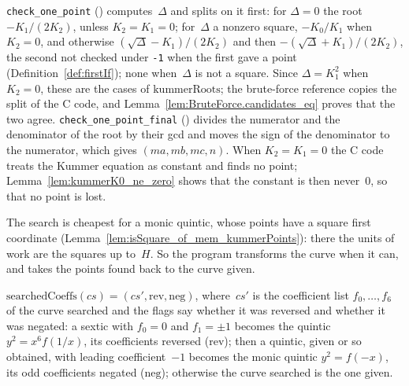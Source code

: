 \begin{remark}\label{rem:specRootsC}
  \texttt{check\_one\_point} () computes~$\Delta$ and splits on it
  first: for $\Delta = 0$ the root $-K_1/(2 K_2)$, unless $K_2 = K_1 = 0$; for~$\Delta$ a nonzero
  square, $-K_0/K_1$ when $K_2 = 0$, and otherwise $(\sqrt{\Delta} - K_1)/(2 K_2)$ and then
  $-(\sqrt{\Delta} + K_1)/(2 K_2)$, the second not checked under \texttt{-1} when the first gave a
  point (Definition~\ref{def:firstIf}); none when~$\Delta$ is not a square. Since $\Delta = K_1^2$
  when $K_2 = 0$, these are the cases of $\mathrm{kummerRoots}$; the brute-force reference copies
  the split of the C code, and Lemma~\ref{lem:BruteForce.candidates_eq} proves that the two agree.
  \texttt{check\_one\_point\_final} () divides the numerator and
  the denominator of the root by their gcd and moves the sign of the denominator to the numerator,
  which gives $(m a, m b, m c, n)$. When $K_2 = K_1 = 0$ the C code treats the Kummer equation as
  constant and finds no point; Lemma~\ref{lem:kummerK0_ne_zero} shows that the constant is then
  never~$0$, so that no point is lost.
\end{remark}

The search is cheapest for a monic quintic, whose points have a square first coordinate
(Lemma~\ref{lem:isSquare_of_mem_kummerPoints}): there the units of work are the squares up to~$H$.
So the program transforms the curve when it can, and takes the points found back to the curve
given.

\begin{definition}\label{def:searchedCoeffs}
  \leanok
  $\mathrm{searchedCoeffs}(cs) = (cs', \mathrm{rev}, \mathrm{neg})$, where~$cs'$ is the coefficient
  list $f_0, \dots, f_6$ of the curve searched and the flags say whether it was reversed and
  whether it was negated: a sextic with $f_0 = 0$ and $f_1 = \pm 1$ becomes the quintic
  $y^2 = x^6 f(1/x)$, its coefficients reversed ($\mathrm{rev}$); then a quintic, given or so
  obtained, with leading coefficient~$-1$ becomes the monic quintic $y^2 = f(-x)$, its odd
  coefficients negated ($\mathrm{neg}$); otherwise the curve searched is the one given.
\end{definition}

